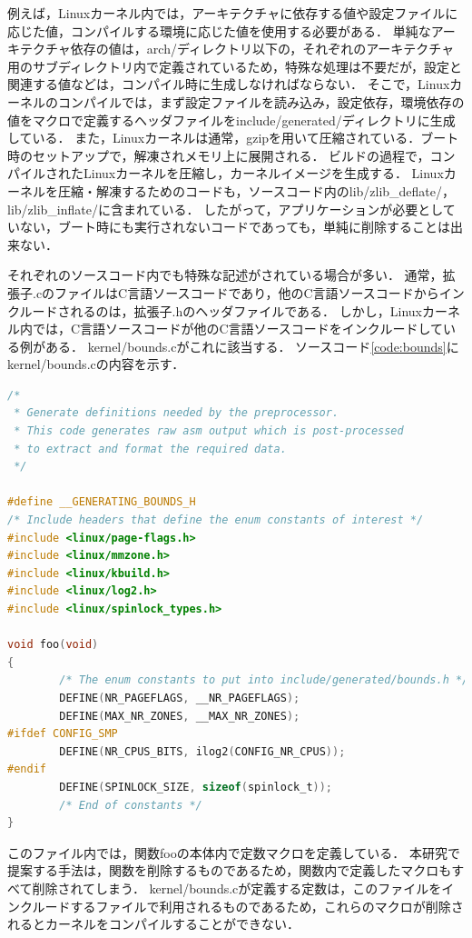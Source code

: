 \documentclass[graduation-thesis]{mlarticle}
\begin{document}
例えば，Linuxカーネル内では，アーキテクチャに依存する値や設定ファイルに応じた値，コンパイルする環境に応じた値を使用する必要がある．
単純なアーキテクチャ依存の値は，arch/ディレクトリ以下の，それぞれのアーキテクチャ用のサブディレクトリ内で定義されているため，特殊な処理は不要だが，設定と関連する値などは，コンパイル時に生成しなければならない．
そこで，Linuxカーネルのコンパイルでは，まず設定ファイルを読み込み，設定依存，環境依存の値をマクロで定義するヘッダファイルをinclude/generated/ディレクトリに生成している．
また，Linuxカーネルは通常，gzipを用いて圧縮されている．ブート時のセットアップで，解凍されメモリ上に展開される．
ビルドの過程で，コンパイルされたLinuxカーネルを圧縮し，カーネルイメージを生成する．
Linuxカーネルを圧縮・解凍するためのコードも，ソースコード内のlib/zlib\_deflate/，lib/zlib\_inflate/に含まれている．
したがって，アプリケーションが必要としていない，ブート時にも実行されないコードであっても，単純に削除することは出来ない．


それぞれのソースコード内でも特殊な記述がされている場合が多い．
通常，拡張子.cのファイルはC言語ソースコードであり，他のC言語ソースコードからインクルードされるのは，拡張子.hのヘッダファイルである．
しかし，Linuxカーネル内では，C言語ソースコードが他のC言語ソースコードをインクルードしている例がある．
kernel/bounds.cがこれに該当する．
ソースコード\ref{code:bounds}にkernel/bounds.cの内容を示す．

\begin{lstlisting}[language=C, caption=kernel/bounds.c, label=code:bounds]
/*
 * Generate definitions needed by the preprocessor.
 * This code generates raw asm output which is post-processed
 * to extract and format the required data.
 */

#define __GENERATING_BOUNDS_H
/* Include headers that define the enum constants of interest */
#include <linux/page-flags.h>
#include <linux/mmzone.h>
#include <linux/kbuild.h>
#include <linux/log2.h>
#include <linux/spinlock_types.h>

void foo(void)
{
        /* The enum constants to put into include/generated/bounds.h */
        DEFINE(NR_PAGEFLAGS, __NR_PAGEFLAGS);
        DEFINE(MAX_NR_ZONES, __MAX_NR_ZONES);
#ifdef CONFIG_SMP
        DEFINE(NR_CPUS_BITS, ilog2(CONFIG_NR_CPUS));
#endif
        DEFINE(SPINLOCK_SIZE, sizeof(spinlock_t));
        /* End of constants */
}
\end{lstlisting}

このファイル内では，関数fooの本体内で定数マクロを定義している．
本研究で提案する手法は，関数を削除するものであるため，関数内で定義したマクロもすべて削除されてしまう．
kernel/bounds.cが定義する定数は，このファイルをインクルードするファイルで利用されるものであるため，これらのマクロが削除されるとカーネルをコンパイルすることができない．
\end{document}
